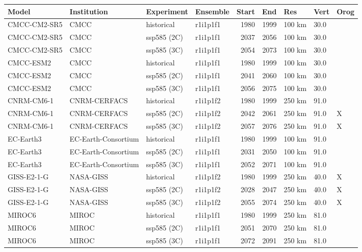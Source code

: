 \documentclass[pdflatex, sn-nature]{sn-jnl}\usepackage[]{graphicx}\usepackage[]{xcolor}
\begin{document}
\begin{table}[h]
\centering
\begingroup\footnotesize
\begin{tabular}{llllrrlll}
  \toprule
Model & Institution & Experiment & Ensemble & Start & End & Res & Vert & Orog \\ 
  \midrule
CMCC-CM2-SR5 & CMCC & historical & r1i1p1f1 & 1980 & 1999 & 100 km & 30.0 &  \\ 
  CMCC-CM2-SR5 & CMCC & ssp585 (2C) & r1i1p1f1 & 2037 & 2056 & 100 km & 30.0 &  \\ 
  CMCC-CM2-SR5 & CMCC & ssp585 (3C) & r1i1p1f1 & 2054 & 2073 & 100 km & 30.0 &  \\ 
  CMCC-ESM2 & CMCC & historical & r1i1p1f1 & 1980 & 1999 & 100 km & 30.0 &  \\ 
  CMCC-ESM2 & CMCC & ssp585 (2C) & r1i1p1f1 & 2041 & 2060 & 100 km & 30.0 &  \\ 
  CMCC-ESM2 & CMCC & ssp585 (3C) & r1i1p1f1 & 2056 & 2075 & 100 km & 30.0 &  \\ 
  CNRM-CM6-1 & CNRM-CERFACS & historical & r1i1p1f2 & 1980 & 1999 & 250 km & 91.0 &  \\ 
  CNRM-CM6-1 & CNRM-CERFACS & ssp585 (2C) & r1i1p1f2 & 2042 & 2061 & 250 km & 91.0 & X \\ 
  CNRM-CM6-1 & CNRM-CERFACS & ssp585 (3C) & r1i1p1f2 & 2057 & 2076 & 250 km & 91.0 & X \\ 
  EC-Earth3 & EC-Earth-Consortium & historical & r1i1p1f1 & 1980 & 1999 & 100 km & 91.0 &  \\ 
  EC-Earth3 & EC-Earth-Consortium & ssp585 (2C) & r1i1p1f1 & 2031 & 2050 & 100 km & 91.0 &  \\ 
  EC-Earth3 & EC-Earth-Consortium & ssp585 (3C) & r1i1p1f1 & 2052 & 2071 & 100 km & 91.0 &  \\ 
  GISS-E2-1-G & NASA-GISS & historical & r1i1p1f2 & 1980 & 1999 & 250 km & 40.0 & X \\ 
  GISS-E2-1-G & NASA-GISS & ssp585 (2C) & r1i1p1f2 & 2028 & 2047 & 250 km & 40.0 & X \\ 
  GISS-E2-1-G & NASA-GISS & ssp585 (3C) & r1i1p1f2 & 2055 & 2074 & 250 km & 40.0 & X \\ 
  MIROC6 & MIROC & historical & r1i1p1f1 & 1980 & 1999 & 250 km & 81.0 &  \\ 
  MIROC6 & MIROC & ssp585 (2C) & r1i1p1f1 & 2051 & 2070 & 250 km & 81.0 &  \\ 
  MIROC6 & MIROC & ssp585 (3C) & r1i1p1f1 & 2072 & 2091 & 250 km & 81.0 &  \\ 

\end{tabular}
\end{table}
\end{document}
